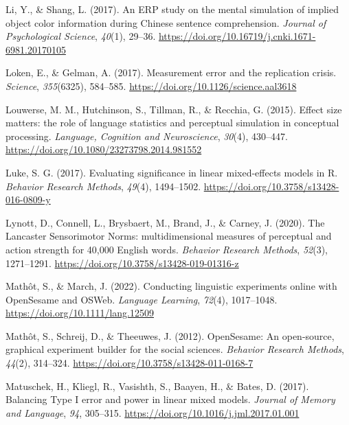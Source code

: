 \documentclass[
  man,floatsintext]{apa7}
\newlength{\cslhangindent}
\newlength{\cslentryspacingunit} %
\newenvironment{CSLReferences}[2] %
 {%
  \setlength{\parindent}{0pt}
  \ifodd #1
  \let\oldpar\par
  \def\par{\hangindent=\cslhangindent\oldpar}
  \fi
  \setlength{\parskip}{#2\cslentryspacingunit}
 }%
 {}
\begin{document}
\begin{CSLReferences}{1}{0}
\leavevmode{}%
Li, Y., \& Shang, L. (2017). {An ERP study on the mental simulation of implied object color information during Chinese sentence comprehension}. \emph{Journal of Psychological Science}, \emph{40}(1), 29--36. \url{https://doi.org/10.16719/j.cnki.1671-6981.20170105}

\leavevmode{}%
Loken, E., \& Gelman, A. (2017). Measurement error and the replication crisis. \emph{Science}, \emph{355}(6325), 584--585. \url{https://doi.org/10.1126/science.aal3618}

\leavevmode{}%
Louwerse, M. M., Hutchinson, S., Tillman, R., \& Recchia, G. (2015). Effect size matters: the role of language statistics and perceptual simulation in conceptual processing. \emph{Language, Cognition and Neuroscience}, \emph{30}(4), 430--447. \url{https://doi.org/10.1080/23273798.2014.981552}

\leavevmode{}%
Luke, S. G. (2017). Evaluating significance in linear mixed-effects models in {R}. \emph{Behavior Research Methods}, \emph{49}(4), 1494--1502. \url{https://doi.org/10.3758/s13428-016-0809-y}

\leavevmode{}%
Lynott, D., Connell, L., Brysbaert, M., Brand, J., \& Carney, J. (2020). The Lancaster Sensorimotor Norms: multidimensional measures of perceptual and action strength for 40,000 English words. \emph{Behavior Research Methods}, \emph{52}(3), 1271--1291. \url{https://doi.org/10.3758/s13428-019-01316-z}

\leavevmode{}%
Mathôt, S., \& March, J. (2022). Conducting {linguistic} {experiments} {online} {with} {OpenSesame} and {OSWeb}. \emph{Language Learning}, \emph{72}(4), 1017--1048. \url{https://doi.org/10.1111/lang.12509}

\leavevmode{}%
Mathôt, S., Schreij, D., \& Theeuwes, J. (2012). {OpenSesame}: {An} open-source, graphical experiment builder for the social sciences. \emph{Behavior Research Methods}, \emph{44}(2), 314--324. \url{https://doi.org/10.3758/s13428-011-0168-7}

\leavevmode{}%
Matuschek, H., Kliegl, R., Vasishth, S., Baayen, H., \& Bates, D. (2017). Balancing Type I error and power in linear mixed models. \emph{Journal of Memory and Language}, \emph{94}, 305--315. \url{https://doi.org/10.1016/j.jml.2017.01.001}


\end{CSLReferences}
\end{document}
